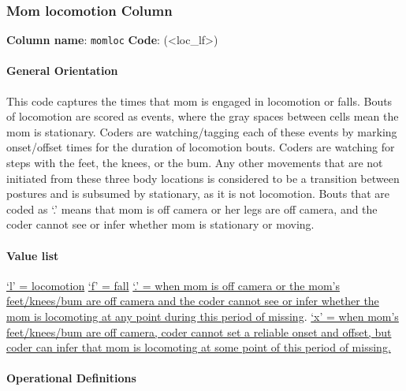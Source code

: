 \documentclass[
  12pt,
]{book}
\begin{document}
\hypertarget{mom-locomotion-column}{%
\subsubsection*{Mom locomotion Column}\label{mom-locomotion-column}}

\textbf{Column name}: \texttt{momloc}
\textbf{Code}: (\textless loc\_lf\textgreater)

\hypertarget{general-orientation-4}{%
\paragraph*{General Orientation}\label{general-orientation-4}}

This code captures the times that mom is engaged in locomotion or falls. Bouts of locomotion are scored as events, where the gray spaces between cells mean the mom is stationary. Coders are watching/tagging each of these events by marking onset/offset times for the duration of locomotion bouts. Coders are watching for steps with the feet, the knees, or the bum. Any other movements that are not initiated from these three body locations is considered to be a transition between postures and is subsumed by stationary, as it is not locomotion. Bouts that are coded as `.' means that mom is off camera or her legs are off camera, and the coder cannot see or infer whether mom is stationary or moving.

\hypertarget{value-list-1}{%
\paragraph*{Value list}\label{value-list-1}}

\protect\hyperlink{mom_locomotion}{`l' = locomotion}
\protect\hyperlink{mom_fall}{`f' = fall}
\protect\hyperlink{mom-missing}{`.' = when mom is off camera or the mom's feet/knees/bum are off camera and the coder cannot see or infer whether the mom is locomoting at any point during this period of missing}.
\protect\hyperlink{mom_undetermined}{`x' = when mom's feet/knees/bum are off camera, coder cannot set a reliable onset and offset, but coder can infer that mom is locomoting at some point of this period of missing.}

\hypertarget{operational-definitions-2}{%
\paragraph*{Operational Definitions}\label{operational-definitions-2}}
\end{document}

